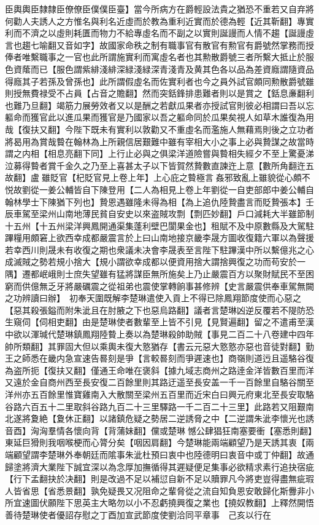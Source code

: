 臣輿輿臣隸隸臣僚僚臣僕僕臣臺】當今所病方在爵輕設法貴之猶恐不重若又自弃將何勸人夫誘人之方惟名與利名近虛而於教為重利近實而於德為輕【近其靳翻】專實利而不濟之以虛則耗匱而物力不給專虛名而不副之以實則誕謾而人情不趨【誕謾虛言也趨七喻翻又音如字】故國家命秩之制有職事官有散官有勲官有爵號然掌務而授俸者唯繫職事之一官也此所謂施實利而寓虛名者也其勲散爵號三者所繫大抵止於服色資䕃而已【服色謂紫緋淺緋深緑淺緑深青淺青及黄其色各以品為差資廕謂隨資品得廕其子若孫及曾孫也】此所謂假虛名而佐實利者也今之員外試官頗同勲散爵號雖則授無費禄受不占員【占音之贍翻】然而突銛鋒排患難者則以是賞之【銛息亷翻利也難乃旦翻】竭筋力展勞效者又以是酬之若獻瓜果者亦授試官則彼必相謂曰吾以忘軀命而獲官此以進瓜果而獲官是乃國家以吾之軀命同於瓜果矣視人如草木誰復為用哉【復扶又翻】今陛下既未有實利以敦勸又不重虛名而濫施人無藉焉則後之立功者將曷用為賞哉䞇在翰林為上所親信居艱難中雖有宰相大小之事上必與贄謀之故當時謂之内相【相息亮翻下同】上行止必與之俱梁洋道險嘗與䞇相失經夕不至上驚憂涕泣募得䞇者賞千金久之乃至上喜甚太子以下皆賀然贄數直諫迕上意【數所角翻迕五故翻】盧雖貶官【杞貶官見上卷上年】上心庇之䞇極言姦邪致亂上雖貌從心頗不悦故劉從一姜公輔皆自下陳登用【二人為相見上卷上年劉從一自吏部郎中姜公輔自翰林學士下陳猶下列也】贄恩遇雖隆未得為相【為上追仇陸贄盡言而貶贄張本】壬辰車駕至梁州山南地薄民貧自安史以來盗賊攻剽【剽匹妙翻】戶口減耗大半雖節制十五州【十五州梁洋興鳳開通渠集蓬利壁巴閬果金也】租賦不及中原數縣及大駕駐蹕糧用頗窘上欲西幸成都嚴震言於上曰山南地接京畿李晟方圖收復籍六軍以為聲援若幸西川則晟未有收復之期也衆議未决會李晟表至言陛下駐蹕漢中所以繫億兆之心成滅賊之勢若規小捨大【規小謂欲幸成都以便資用捨大謂捨興復之功而苟安於一隅】遷都岷峨則士庶失望雖有猛將謀臣無所施矣上乃止嚴震百方以聚財賦民不至困窮而供億無乏牙將嚴礪震之從祖弟也震使掌轉餉事甚修辨【史言嚴震供奉車駕無闕之功辨讀曰辦】　初奉天圍既解李楚琳遣使入貢上不得已除鳳翔節度使而心惡之【惡其殺張鎰而附朱泚且在肘腋之下也惡烏路翻】議者言楚琳凶逆反覆若不隄防恐生窺伺【伺相吏翻】由是楚琳使者數輩至上皆不引見【見賢遍翻】留之不遣甫至漢中欲以渾瑊代楚琳鎮鳳翔陸䞇上奏以為楚琳殺帥助賊【事見二百二十八卷建中四年帥所類翻】其罪固大但以乘輿未復大憝猶存【書云元惡大憝憝亦惡也音徒對翻】勤王之師悉在畿内急宣速告晷刻是爭【言較晷刻而爭遲速也】商嶺則道迃且遥駱谷復為盗所扼【復扶又翻】僅通王命唯在褒斜【據九域志商州之路逹金洋皆數百里而洋又遠於金自商州西至長安復二百餘里則其路迂遥至長安盖一千一百餘里自駱谷關至洋州亦五百餘里惟寶雞南入大散關至梁州五百里而近宋白曰興元府東北至長安取駱谷路六百五十二里取斜谷路九百二十三里驛路一千二百二十三里】此路若又阻艱南北遂將夐絶【夐休正翻】以諸鎮危疑之勢居二逆誘脅之中【二逆謂朱泚李懷光也誘音酉】洶洶羣情各懷向背【背蒲妹翻】儻或楚琳憾公肆猖狂南塞要衝【塞悉則翻】東延巨猾則我咽喉梗而心膂分矣【咽因肩翻】今楚琳能兩端顧望乃是天誘其衷【兩端顧望謂李楚琳外奉朝廷而隂事朱泚杜預曰衷中也陸德明曰衷音中或丁仲翻】故通歸塗將濟大業陛下誠宜深以為念厚加撫循得其遲疑便足集事必欲精求素行追抉宿疵【行下孟翻抉於决翻】則是改過不足以補愆自新不足以贖罪凡今將吏豈得盡無疵瑕人皆省思【省悉景翻】孰免疑畏又况阻命之輩脅從之流自知負恩安敢歸化斯釁非小所宜速圖伏願陛下思英主大略勿以小不忍虧撓興復之業也【撓奴教翻】上釋然開悟善待楚琳使者優詔存慰之丁酉加宣武節度使劉洽同平章事　己亥以行在

